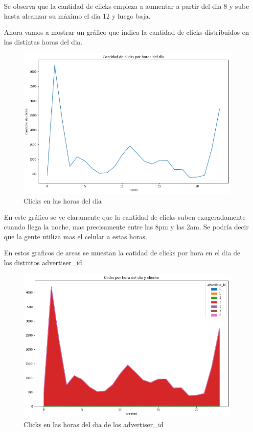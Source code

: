 \documentclass[a4paper, 12pt]{article}
\newcommand\tab[1][1cm]{\hspace*{#1}}
\begin{document}
		\tab Se observa que la cantidad de clicks empieza a aumentar a partir del dia 8 y sube hasta alcanzar su máximo el dia 12 y luego baja.

		\tab Ahora vamos a mostrar un gráfico que indica la cantidad de clicks distribuidos en las distintas horas del dia.

		\FloatBarrier
		\begin{figure}[h]
			\centering
			\includegraphics[width=\textwidth]{images/clicks/clicks_hours.png}
			\caption{Clicks en las horas del dia}
		\end{figure}
		\FloatBarrier
		
		\tab En este gráfico se ve claramente que la cantidad de clicks suben exageradamente cuando llega la noche, mas precisamente entre las 8pm y las 2am. Se podría decir que la gente utiliza mas el celular a estas horas.

		\tab En estos graficos de areas se muestan la catidad de clicks por hora en el dia de los distintos advertiser_id

		\FloatBarrier
		\begin{figure}[h]
			\centering
			\includegraphics[width=\textwidth]{images/clicks/clicks_advertiser_id_hours.png}
			\caption{Clicks en las horas del dia de los advertiser_id}
		\end{figure}
		\FloatBarrier
	
\end{document}
